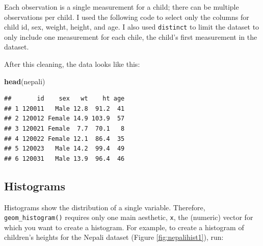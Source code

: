 \documentclass[]{book}
\makeatletter
\newenvironment{Shaded}{\begin{snugshade}}{\end{snugshade}}
\newcommand{\KeywordTok}[1]{\textcolor[rgb]{0.13,0.29,0.53}{\textbf{#1}}}
\newcommand{\DataTypeTok}[1]{\textcolor[rgb]{0.13,0.29,0.53}{#1}}
\newcommand{\DecValTok}[1]{\textcolor[rgb]{0.00,0.00,0.81}{#1}}
\newcommand{\StringTok}[1]{\textcolor[rgb]{0.31,0.60,0.02}{#1}}
\newcommand{\OtherTok}[1]{\textcolor[rgb]{0.56,0.35,0.01}{#1}}
\newcommand{\OperatorTok}[1]{\textcolor[rgb]{0.81,0.36,0.00}{\textbf{#1}}}
\newcommand{\NormalTok}[1]{#1}
\newenvironment{kframe}{%
\medskip{}
\setlength{\fboxsep}{.8em}
 \def\at@end@of@kframe{}%
 \ifinner\ifhmode%
  \def\at@end@of@kframe{\end{minipage}}%
  \begin{minipage}{\columnwidth}%
 \fi\fi%
 \def\FrameCommand##1{\hskip\@totalleftmargin \hskip-\fboxsep
 \colorbox{shadecolor}{##1}\hskip-\fboxsep
     \hskip-\linewidth \hskip-\@totalleftmargin \hskip\columnwidth}%
 \MakeFramed {\advance\hsize-\width
   \@totalleftmargin\z@ \linewidth\hsize
   \@setminipage}}%
 {\par\unskip\endMakeFramed%
 \at@end@of@kframe}
\renewenvironment{Shaded}{\begin{kframe}}{\end{kframe}}
\theoremstyle{definition}
\theoremstyle{definition}
\theoremstyle{definition}
\theoremstyle{remark}
\makeatother
\begin{document}
Each observation is a single measurement for a child; there can be
multiple observations per child. I used the following code to select
only the columns for child id, sex, weight, height, and age. I also used
\texttt{distinct} to limit the dataset to only include one measurement
for each chile, the child's first measurement in the dataset.

\begin{Shaded}
\end{Shaded}

After this cleaning, the data looks like this:

\begin{Shaded}
\begin{Highlighting}[]
\KeywordTok{head}\NormalTok{(nepali)}
\end{Highlighting}
\end{Shaded}

\begin{verbatim}
##       id    sex   wt    ht age
## 1 120011   Male 12.8  91.2  41
## 2 120012 Female 14.9 103.9  57
## 3 120021 Female  7.7  70.1   8
## 4 120022 Female 12.1  86.4  35
## 5 120023   Male 14.2  99.4  49
## 6 120031   Male 13.9  96.4  46
\end{verbatim}

\subsection{Histograms}\label{histograms}

Histograms show the distribution of a single variable. Therefore,
\texttt{geom\_histogram()} requires only one main aesthetic, \texttt{x},
the (numeric) vector for which you want to create a histogram. For
example, to create a histogram of children's heights for the Nepali
dataset (Figure \ref{fig:nepalihist1}), run:
\end{document}
